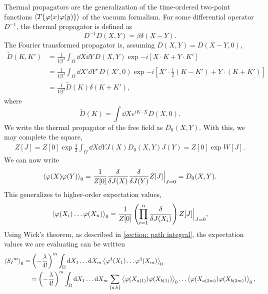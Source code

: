 %
Thermal propagators are the generalization of the time-ordered two-point functions $\left\langle T\{\varphi(x) \varphi(y) \} \right\rangle$ of the vacuum formalism.
For some differential operator $D^{-1}$, the thermal propagator is defined as
%
\begin{equation}
    D^{-1} D(X, Y) = \beta \delta(X - Y).
\end{equation}
%
The Fourier transformed propagator is, assuming $D(X, Y) = D(X-Y, 0)$,
%
\begin{align}
    \nonumber
    \tilde D(K, K') 
    & = \frac{1}{V \beta^3} \int_{\Omega} \dd X \dd Y \, 
    D(X, Y) \exp{- i [X\cdot K + Y\cdot K']} \\ \nonumber
    & = \frac{1}{V \beta^3} \int_{\Omega} \dd X' \dd Y' \, D(X', 0) 
    \exp{- i [X'\cdot \frac{1}{2} (K - K') + Y \cdot (K + K')] } \\
    & = \frac{1}{V \beta^2} \tilde D(K) \delta(K + K'),
\end{align}
where
%
\begin{equation}
    \tilde D(K) = \int \dd X e^{iK\cdot X} D(X, 0).
\end{equation}
%
We write the thermal propagator of the free field as $D_0(X, Y)$.
With this, we may complete the square,
%
\begin{align}
    Z[J] = Z[0]
    \exp{\frac{1}{2} \int_{\Omega} \dd X \dd Y J(X) D_0(X, Y) J(Y)}
    = Z[0] \exp{W[J]}.
\end{align}
We can now write
%
\begin{equation}
    \left\langle \varphi(X)\varphi(Y) \right\rangle_0 
    = \frac{1}{Z[0]}
    \frac{\delta}{\delta J(X)} \frac{\delta}{\delta J(Y)} 
    Z[J] \Big|_{J=0} 
    = D_0(X, Y).
\end{equation}
%
This generalizes to higher-order expectation values,
%
\begin{equation}
    \left\langle \varphi(X_i) \dots \varphi(X_n) \right\rangle_0
    = \frac{1}{Z[0]} \left(\prod_{i=1}^n \frac{\delta}{\delta J(X_i)}\right) 
    Z[J] \Big|_{J=0},
\end{equation}
%
Using Wick's theorem, as described in \autoref{section: path integral}, the expectation values we are evaluating can be written
%
\begin{align*}
    \left\langle {S_I}^m \right\rangle_0 & 
    = \left(- \frac{\lambda }{4!}\right)^m 
    \int_{\Omega} \text{d} X_1 \dots \text{d} X_m
    \left\langle \varphi^4(X_1) \dots \varphi^4(X_m) \right\rangle_0 \\ 
    & \quad
    = \left(- \frac{\lambda }{4!}\right)^m 
    \int_{\Omega} \text{d} X_1 \dots \text{d} X_m \sum_{\{a, b\}}
    \left\langle \varphi(X_{a(1)}) \varphi(X_{b(1)}) \right\rangle_0
    \dots
    \left\langle \varphi(X_{a(2m)}) \varphi(X_{b(2m)}) \right\rangle_0,
\end{align*}
